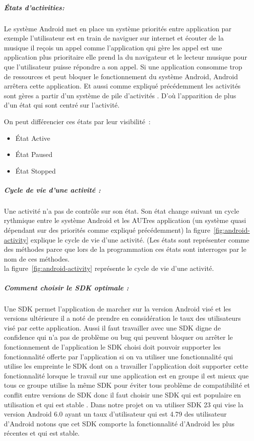\subparagraph{États d'activities:}

Le système Android met en place un système priorités entre application
par exemple l'utilisateur est en train de naviguer sur internet et écouter
de la musique il reçois un appel comme l'application qui gère les appel est
une application plus prioritaire elle prend la du navigateur et le lecteur
musique pour que l'utilisateur puisse répondre a son appel. Si une application
consomme trop de ressources et peut bloquer le fonctionnement du système Android,
Android arrêtera cette application. Et aussi comme expliqué précédemment
les activités sont gères a partir d'un système de pile d'activités .
D'où l'apparition de plus d'un état qui sont centré sur l'activité.

On peut différencier ces états par leur visibilité :
\begin{itemize}
 \item État Active
 \item État Paused
 \item État Stopped
\end{itemize}

\subparagraph{Cycle de vie d'une activité :}

Une activité n'a pas de contrôle sur son état.
Son état change suivant un cycle rythmique entre le système Android et les
AUTres application (un système quasi dépendant sur des priorités comme expliqué
précédemment) la figure~\ref{fig:android-activity} explique le cycle de vie
d'une activité. (Les états sont représenter comme des méthodes parce que lors de
la programmation ces états sont interroges par le nom de ces méthodes.\\
la figure~\ref{fig:android-activity} représente le cycle de vie d'une activité.



\subparagraph{Comment choisir le SDK optimale :}

Une SDK permet l'application de marcher sur la version Android visé
et les versions ultérieure il  a noté de prendre en considération le taux des
utilisateurs visé par cette application. Aussi il faut travailler avec une SDK
digne de confidence qui n'a pas de problème ou bug qui peuvent  bloquer ou arrêter
le fonctionnement de l'application le SDK choisi doit pouvoir supporter les
fonctionnalité offerte par l'application si on va utiliser une fonctionnalité
qui utilise les empreinte le SDK dont on a travailler l'application doit supporter
cette fonctionnalité lorsque le travail sur une application est en groupe il est
mieux que tous ce groupe utilise la même SDK pour éviter tous problème de
compatibilité et conflit entre versions de SDK  donc il faut choisir une SDK
qui est populaire en utilisation et qui est stable . Dans notre projet on va
utiliser SDK 23 qui vise la version Android 6.0 ayant un taux d'utilisateur
qui est 4.79 %
des utilisateur d'Android notons que cet SDK comporte
la fonctionnalité d'Android les plus récentes et qui est stable.

